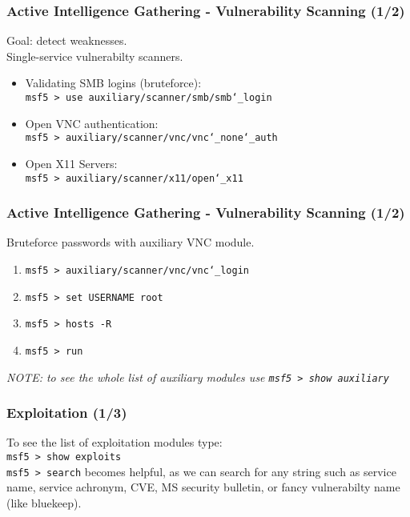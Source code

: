 \documentclass[aspectratio=169]{beamer}
\begin{document}
\begin{frame}
\frametitle{Active Intelligence Gathering - Vulnerability Scanning (1/2)}

Goal: detect weaknesses.\\ 

Single-service vulnerabilty scanners.

\begin{itemize}
    \item Validating SMB logins (bruteforce):\\
    \indent\texttt{msf5 > use auxiliary/scanner/smb/smb\char`\_login}
    \item Open VNC authentication:\\
    \indent\texttt{msf5 > auxiliary/scanner/vnc/vnc\char`\_none\char`\_auth}
    \item Open X11 Servers:\\
    \indent\texttt{msf5 > auxiliary/scanner/x11/open\char`\_x11}
\end{itemize}

\end{frame}

\begin{frame}
\frametitle{Active Intelligence Gathering - Vulnerability Scanning (1/2)}

Bruteforce passwords with auxiliary VNC module.\\

\begin{enumerate}
    \item \texttt{msf5 > auxiliary/scanner/vnc/vnc\char`\_login} \\
    \item \texttt{msf5 > set USERNAME root} \\
    \item \texttt{msf5 > hosts -R} \\
    \item \texttt{msf5 > run}
\end{enumerate}

\vspace{10pt}
\textit{NOTE: to see the whole list of auxiliary modules use \texttt{msf5 > show auxiliary}}

\end{frame}

\begin{frame}
\frametitle{Exploitation (1/3)}

To see the list of exploitation modules type: \\

\indent\texttt{msf5 > show exploits} \\

\vspace{10pt}
\texttt{msf5 > search} becomes helpful, as we can search for any string such as service name, service achronym, CVE, MS security bulletin, or fancy vulnerabilty name (like bluekeep).

\end{frame}
\end{document}
